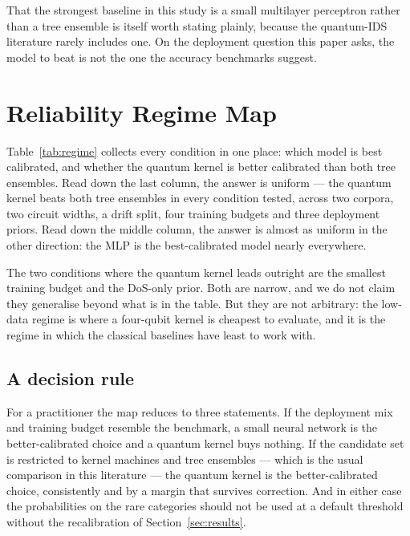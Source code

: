 \documentclass[journal]{IEEEtran}
\begin{document}
That the strongest baseline in this study is a small multilayer perceptron
rather than a tree ensemble is itself worth stating plainly, because the
quantum-IDS literature rarely includes one. On the deployment question this
paper asks, the model to beat is not the one the accuracy benchmarks
suggest.

\section{Reliability Regime Map}\label{sec:regime}



Table~\ref{tab:regime} collects every condition in one place: which model is
best calibrated, and whether the quantum kernel is better calibrated than
both tree ensembles. Read down the last column, the answer is uniform ---
the quantum kernel beats both tree ensembles in every condition tested,
across two corpora, two circuit widths, a drift split, four training
budgets and three deployment priors. Read down the middle column, the
answer is almost as uniform in the other direction: the MLP is the
best-calibrated model nearly everywhere.

The two conditions where the quantum kernel leads outright are the smallest
training budget and the DoS-only prior. Both are narrow, and we do not
claim they generalise beyond what is in the table. But they are not
arbitrary: the low-data regime is where a four-qubit kernel is cheapest to
evaluate, and it is the regime in which the classical baselines have least
to work with.

\subsection*{A decision rule}
For a practitioner the map reduces to three statements. If the deployment
mix and training budget resemble the benchmark, a small neural network is
the better-calibrated choice and a quantum kernel buys nothing. If the
candidate set is restricted to kernel machines and tree ensembles --- which
is the usual comparison in this literature --- the quantum kernel is the
better-calibrated choice, consistently and by a margin that survives
correction. And in either case the probabilities on the rare categories
should not be used at a default threshold without the recalibration of
Section~\ref{sec:results}.

\end{document}

